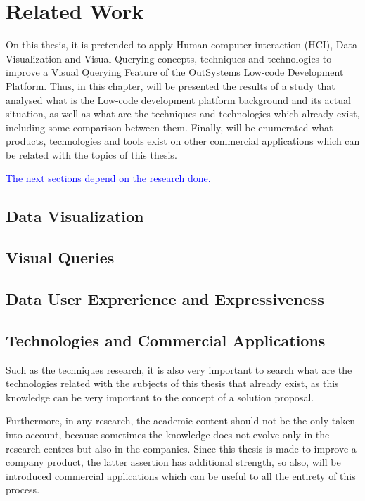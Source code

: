 \chapter{Related Work}
\label{cha:related_work}
On this thesis, it is pretended to apply Human-computer interaction (HCI), Data Visualization and Visual Querying concepts, techniques and technologies to improve a Visual Querying Feature of the OutSystems Low-code Development Platform. Thus, in this chapter, will be presented the results of a study that analysed what is the Low-code development platform background and its actual situation, as well as what are the techniques and technologies which already exist, including some comparison between them. Finally, will be enumerated what products, technologies and tools exist on other commercial applications which can be related with the topics of this thesis.


\textcolor{blue}{The next sections depend on the research done.}

\section{Data Visualization}
\label{sec:data_visualization}

\section{Visual Queries}
\label{sec:visual_queries}

\section{Data User Exprerience and Expressiveness}
\label{sec:data_user_experience_and_expressiveness}

\section{Technologies and Commercial Applications}
\label{sec:technologies_and_commercial_applications}
Such as the techniques research, it is also very important to search what are the technologies related with the subjects of this thesis that already exist, as this knowledge can be very important to the concept of a solution proposal.

Furthermore, in any research, the academic content should not be the only taken into account, because sometimes the knowledge does not evolve only in the research centres but also in the companies. Since this thesis is made to improve a company product, the latter assertion has additional strength, so also, will be introduced commercial applications which can be useful to all the entirety of this process.